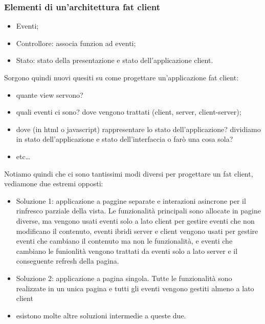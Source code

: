 \subsubsection{Elementi di un'architettura fat client}
\begin{itemize}
    \item Eventi;
    \item Controllore: associa funzion ad eventi;
    \item Stato: stato della presentazione e stato dell'applicazione client.
\end{itemize}
Sorgono quindi nuovi quesiti su come progettare un'applicazione fat client: 
\begin{itemize}
    \item quante view servono?
    \item quali eventi ci sono? dove vengono trattati (client, server, client-server);
    \item dove (in html o javascript) rappresentare lo stato dell'applicazione? dividiamo in stato dell'applicazione e stato dell'interfaccia o farò una cosa sola?
    \item etc\dots
\end{itemize}
Notiamo quindi che ci sono tantissimi modi diversi per progettare un fat client, vediamone due estremi opposti:
\begin{itemize}
    \item Soluzione 1: applicazione a paggine separate e interazioni asincrone per il rinfresco parziale    della vista. Le funzionalità principali sono allocate in pagine diverse, ma vengono usati eventi solo a lato client per gestire eventi che non modificano il contenuto, eventi ibridi server e client vengono usati per gestire eventi che cambiano il contenuto ma non le funzionalità, e eventi che cambiano le funionlità vengono trattati da eventi solo a lato server e il conseguente refresh della pagina.
    \item Soluzione 2: applicazione a pagina singola. Tutte le funzionalità sono realizzate in un unica pagina e tutti gli eventi vengono gestiti almeno a lato client
    \item esistono molte altre soluzioni intermedie a queste due.
\end{itemize}